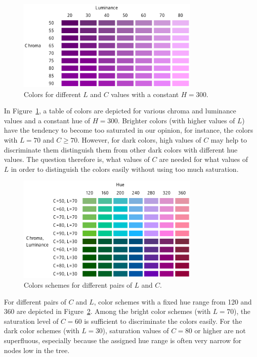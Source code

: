 \documentclass[journal]{vgtc}                %
\begin{document}
\begin{figure}[!b]
  \centering
  \includegraphics[width=3.5in]{LC.pdf}
  \caption{Colors for different $L$ and $C$ values with a constant $H=300$.}\label{fig:lc}
  \vspace{-1ex}
\end{figure}

In Figure~\ref{fig:lc}, a table of colors are depicted for various chroma and luminance values and a constant hue of $H=300$. Brighter colors (with higher values of $L$) have the tendency to become too saturated in our opinion, for instance, the colors with $L=70$ and $C\geq70$. However, for dark colors, high values of $C$ may help to discriminate them distinguish them from other dark colors with different hue values. The question therefore is, what values of $C$ are needed for what values of $L$ in order to distinguish the colors easily without using too much saturation.


\begin{figure}[!b]
  \centering
  \includegraphics[width=3.5in]{LC2.pdf}
  \caption{Colors schemes for different pairs of $L$ and $C$.}\label{fig:lc2}
\end{figure}

For different pairs of $C$ and $L$, color schemes with a fixed hue range from 120 and 360 are depicted in Figure~\ref{fig:lc2}. Among the bright color schemes (with $L=70$), the saturation level of $C=60$ is sufficient to discriminate the colors easily. For the dark color schemes (with $L=30$), saturation values of $C=80$ or higher are not superfluous, especially because the assigned hue range is often very narrow for nodes low in the tree.
\end{document}
